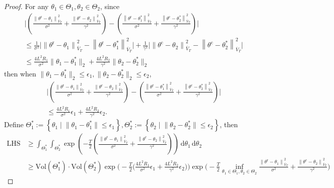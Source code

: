 \documentclass[accepted]{uai2025} %
\theoremstyle{plain}
\theoremstyle{definition}
\theoremstyle{remark}
\newcommand{\truethetac}{\theta^{\mathrm{c}}}
\newcommand{\truethetar}{\theta^{\mathrm{r}}}
\newcommand{\cbr}[1]{\left\{#1\right\}}
\def\cd{\cdot}
\begin{document}
\begin{proof}
For any $\theta_1\in \Theta_1, \theta_2 \in \Theta_2$, since
\begin{align*}
    &\Bigg| \left(\frac{\left\| \truethetar - \theta_1 \right\|^2_{\overline{V}_T}}{\sigma^2} 
    + \frac{\left\| \truethetac - \theta_2 \right\|^2_{\overline{V}_T}}{\gamma^2}\right) 
    - \left(\frac{\left\| \truethetar - \theta^*_1 \right\|^2_{\overline{V}_T}}{\sigma^2} 
    + \frac{\left\| \truethetac - \theta^*_2 \right\|^2_{\overline{V}_T}}{\gamma^2}\right) \Bigg| \\
    &\le \frac{1}{\sigma^2} \Big| \left\| \truethetar - \theta_1 \right\|^2_{\overline{V}_T} 
    - \left\| \truethetar - \theta^*_1 \right\|^2_{\overline{V}_T} \Big| 
    + \frac{1}{\gamma^2} \Big| \left\| \truethetac - \theta_2 \right\|^2_{\overline{V}_T} 
    - \left\| \truethetac - \theta^*_2 \right\|^2_{\overline{V}_T} \Big| \\
    &\le \frac{4L^2 R_1}{\sigma^2} \lVert \theta_1 - \theta^*_1 \rVert_2 
    + \frac{4L^2 R_2}{\gamma^2} \lVert \theta_2 - \theta^*_2 \rVert_2
\end{align*}
then when $\lVert \theta_1-\theta^*_1\rVert_2\le \epsilon_1, \lVert \theta_2-\theta^*_2\rVert_2\le \epsilon_2$,
\begin{align*}
    &\Bigg| \left( \frac{\left\| \truethetar - \theta_1 \right\|^2_{\overline{V}_T}}{\sigma^2} 
    + \frac{\left\| \truethetac - \theta_2 \right\|^2_{\overline{V}_T}}{\gamma^2} \right) 
    - \left( \frac{\left\| \truethetar - \theta^*_1 \right\|^2_{\overline{V}_T}}{\sigma^2} 
    + \frac{\left\| \truethetac - \theta^*_2 \right\|^2_{\overline{V}_T}}{\gamma^2} \right) \Bigg| \\
    &\le \frac{4L^2 R_1}{\sigma^2} \epsilon_1 
    + \frac{4L^2 R_2}{\gamma^2} \epsilon_2.
\end{align*}
Define $\Theta^*_1:=\cbr{\theta_1\mid \lVert \theta_1-\theta^*_1\rVert\le \epsilon_1}, \Theta^*_2:=\cbr{\theta_2\mid \lVert \theta_2-\theta^*_2\rVert\le \epsilon_2}$, then
\begin{align*}
    \mathrm{LHS}&\ge \int_{\Theta^*_1} \int_{\Theta^*_2} \exp\left( -\frac{T}{2} (\frac{\left\| \truethetar - \theta_1 \right\|^2_{\overline{V}_T}}{\sigma^2}+\frac{\left\| \truethetac - \theta_2 \right\|^2_{\overline{V}_T}}{\gamma^2}) \right) \,\mathrm{d}\theta_1 \, \mathrm{d}\theta_2 
    \\&\ge \text{Vol}(\Theta^*_1) \cd \text{Vol}(\Theta^*_2) \exp \bigg(-\frac{T}{2} \Big(\frac{4L^2 R_1}{\sigma^2} \epsilon_1+ \frac{4L^2 R_2}{\gamma^2} \epsilon_2\Big)\bigg) \exp\Big(-\frac{T}{2}\inf_{\theta_1 \in \Theta_1, \theta_2 \in \Theta_2} \frac{\left\| \truethetar - \theta_1 \right\|^2_{\overline{V}_T}}{\sigma^2}+\frac{\left\| \truethetac - \theta_2 \right\|^2_{\overline{V}_T}}{\gamma^2}\Big)

\end{align*}
\end{proof}
\end{document}
